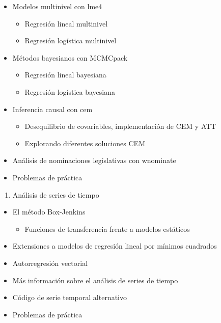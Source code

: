 \documentclass[
]{book}
\providecommand{\tightlist}{%
  \setlength{\itemsep}{0pt}\setlength{\parskip}{0pt}}
\begin{document}
\begin{itemize}
\tightlist
\item
  Modelos multinivel con lme4

  \begin{itemize}
  \tightlist
  \item
    Regresión lineal multinivel
  \item
    Regresión logística multinivel
  \end{itemize}
\item
  Métodos bayesianos con MCMCpack

  \begin{itemize}
  \tightlist
  \item
    Regresión lineal bayesiana
  \item
    Regresión logística bayesiana
  \end{itemize}
\item
  Inferencia causal con cem

  \begin{itemize}
  \tightlist
  \item
    Desequilibrio de covariables, implementación de CEM y ATT
  \item
    Explorando diferentes soluciones CEM
  \end{itemize}
\item
  Análisis de nominaciones legislativas con wnominate
\item
  Problemas de práctica
\end{itemize}

\begin{enumerate}
\def\labelenumi{\arabic{enumi}.}
\setcounter{enumi}{8}
\tightlist
\item
  Análisis de series de tiempo
\end{enumerate}

\begin{itemize}
\tightlist
\item
  El método Box-Jenkins

  \begin{itemize}
  \tightlist
  \item
    Funciones de transferencia frente a modelos estáticos
  \end{itemize}
\item
  Extensiones a modelos de regresión lineal por mínimos cuadrados
\item
  Autorregresión vectorial
\item
  Más información sobre el análisis de series de tiempo
\item
  Código de serie temporal alternativo
\item
  Problemas de práctica
\end{itemize}
\end{document}
